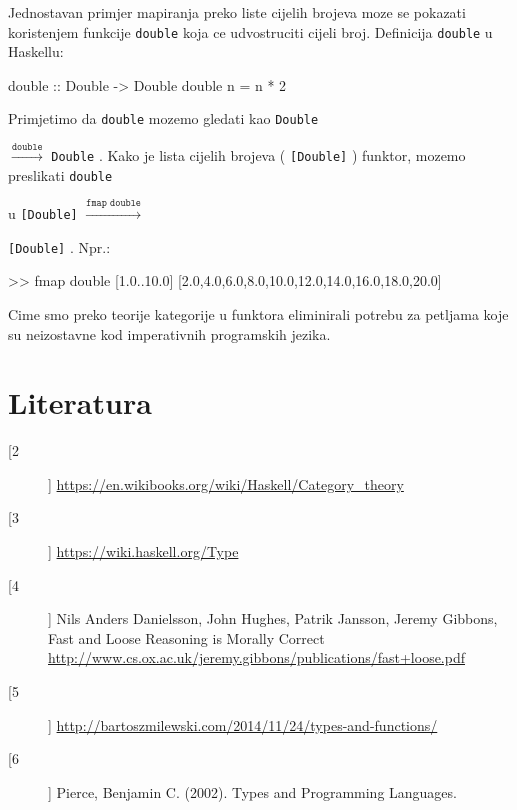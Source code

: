 \documentclass[11pt]{article}
\newcommand{\codei}[1]{
  {\lstinline[basicstyle=\ttfamily]{#1}}
}
\theoremstyle{definition}
\begin{document}
  Jednostavan primjer mapiranja preko liste cijelih brojeva moze se pokazati
  koristenjem funkcije \codei{double} koja ce udvostruciti cijeli broj.
  Definicija \codei{double} u Haskellu:
  \begin{mcode}
    double :: Double -> Double
    double n = n * 2
  \end{mcode}
  Primjetimo da \codei{double} mozemo gledati kao \codei{Double}
  $\xrightarrow{\texttt{double}}$ \codei{Double}. Kako je lista cijelih
  brojeva (\codei{[Double]}) funktor, mozemo preslikati \codei{double} 
  u \codei{[Double]} $\xrightarrow{\texttt{fmap double}}$
  \codei{[Double]}. Npr.:
  \begin{mcode}
    >> fmap double [1.0..10.0]
    [2.0,4.0,6.0,8.0,10.0,12.0,14.0,16.0,18.0,20.0]
  \end{mcode}
  Cime smo preko teorije kategorije u funktora eliminirali potrebu za
  petljama koje su neizostavne kod imperativnih programskih jezika.
  \newpage
  \section*{Literatura}
  \begin{description}
    \item[[2]]
      \url {https://en.wikibooks.org/wiki/Haskell/Category\_theory}
    \item[[3]]
      \url {https://wiki.haskell.org/Type}

    \item[[4]] \label{bib:fast-loose}
      Nils Anders Danielsson, John Hughes, Patrik Jansson, Jeremy Gibbons,
Fast and Loose Reasoning is Morally Correct
\url{http://www.cs.ox.ac.uk/jeremy.gibbons/publications/fast+loose.pdf}
  \item[[5]]
    \url{http://bartoszmilewski.com/2014/11/24/types-and-functions/}
  \item[[6]]
    Pierce, Benjamin C. (2002). Types and Programming Languages.
  \end{description}
\end{document}
